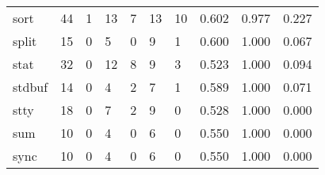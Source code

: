 \begin{longtable}{lp{2.0cm}p{2.0cm}p{2.0cm}p{2.0cm}p{2.0cm}p{2.0cm}p{2.0cm}p{2.0cm}p{2.0cm}}
sort      &                     44 &                                             1 &                                           13 &                                           7 &                                           13 &                                         10 &                                0.602 &                                  0.977 &                                0.227 \\
split     &                     15 &                                             0 &                                            5 &                                           0 &                                            9 &                                          1 &                                0.600 &                                  1.000 &                                0.067 \\
stat      &                     32 &                                             0 &                                           12 &                                           8 &                                            9 &                                          3 &                                0.523 &                                  1.000 &                                0.094 \\
stdbuf    &                     14 &                                             0 &                                            4 &                                           2 &                                            7 &                                          1 &                                0.589 &                                  1.000 &                                0.071 \\
stty      &                     18 &                                             0 &                                            7 &                                           2 &                                            9 &                                          0 &                                0.528 &                                  1.000 &                                0.000 \\
sum       &                     10 &                                             0 &                                            4 &                                           0 &                                            6 &                                          0 &                                0.550 &                                  1.000 &                                0.000 \\
sync      &                     10 &                                             0 &                                            4 &                                           0 &                                            6 &                                          0 &                                0.550 &                                  1.000 &                                0.000 \\

\end{longtable}
